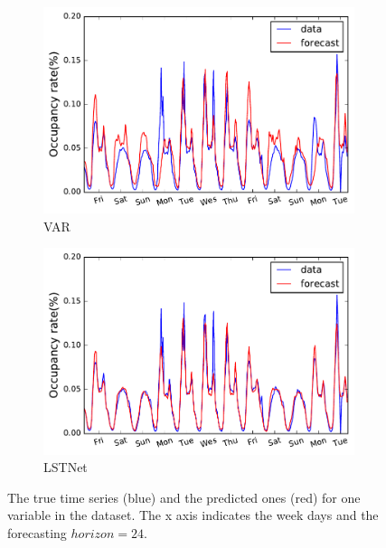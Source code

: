 \begin{figure}[!ht]
  \begin{subfigure}{.23\textwidth}
    \centering
    \includegraphics[width=\linewidth]{fig/traffic-var.pdf}
    \caption{VAR}
    \label{fig:tra-var}
  \end{subfigure}
  \begin{subfigure}{.23\textwidth}
    \centering
    \includegraphics[width=\linewidth]{fig/traffic-tnn.pdf}
    \caption{LSTNet}
    \label{fig:tra-tnn}
  \end{subfigure}
  
  \caption{The true time series (blue) and the predicted ones (red) for one variable in the \traffic dataset. The x axis indicates the week days and the forecasting $horizon = 24$.}
  \label{fig:traffic}
\end{figure}



